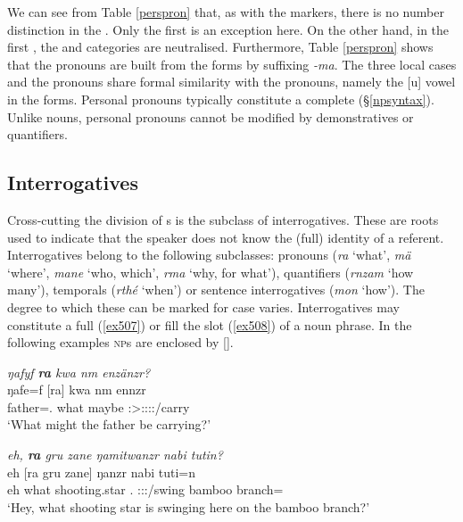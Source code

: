 We can see from Table \ref{perspron} that, as with the  markers, there is no number distinction in the . Only the first  is an exception here. On the other hand, in the first  , the  and  categories are neutralised. Furthermore, Table \ref{perspron} shows that the  pronouns are built from the  forms by suffixing \emph{-ma}. The three local cases and the  pronouns share formal similarity with the  pronouns, namely the [u] vowel in the  forms. Personal pronouns typically constitute a complete  (\S{}\ref{npsyntax}). Unlike nouns, personal pronouns cannot be modified by demonstratives or quantifiers.

\subsection{Interrogatives} \label{interrogatives}

Cross-cutting the division of s is the subclass of interrogatives. These are roots used to indicate that the speaker does not know the (full) identity of a referent. Interrogatives belong to the following  subclasses: pronouns (\emph{ra} `what', \emph{mä} `where', \emph{mane} `who, which', \emph{rma} `why, for what'), quantifiers (\emph{rnzam} `how many'), temporals (\emph{rthé} `when') or sentence interrogatives (\emph{mon} `how'). The degree to which these can be marked for case varies. Interrogatives may constitute a full  (\ref{ex507}) or fill the  slot (\ref{ex508}) of a noun phrase. In the following examples \textsc{np}s are enclosed by [].

\begin{exe}
	\ex \emph{ŋafyf \textbf{ra} kwa nm enzänzr?}\\
	\gll ŋafe=f [ra] kwa nm ennzr\\
	father=\Erg.\Sg{} what \Fut{} maybe \Stsg:\Sbj>\Stpl:\Obj:\Nonpast:\Ipfv:\Venit/carry\\
	\trans `What might the father be carrying?' 
	\label{ex507}
\end{exe}
\begin{exe}
	\ex \emph{eh, \textbf{ra} gru zane ŋamitwanzr nabi tutin?}\\
	\gll eh [ra gru zane] ŋanzr nabi tuti=n\\
	eh what shooting.star \Dem.\Prox{} \Stsg:\Sbj:\Nonpast:\Ipfv/swing bamboo branch=\Loc{}\\
	\trans `Hey, what shooting star is swinging here on the bamboo branch?'\\ 
	\label{ex508}
\end{exe}%

